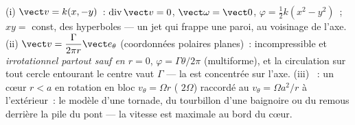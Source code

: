 \begin{example}\label{ex:b2:fluid-kinematics:planeflows}
(i) \emph{} $\vect v = k(x, -y)$~: $\operatorname{div}\vect v =
0$, $\vect\omega = \vect 0$, $\varphi = \tfrac12k(x^2 - y^2)$~; 
$xy = $ const, des hyperboles --- un jet qui frappe une paroi, au voisinage de l'axe. (ii)
\emph{} $\vect v = \dfrac{\Gamma}{2\pi r}\vect e_\theta$ (coordonnées
polaires planes)~: incompressible et \emph{irrotationnel partout
sauf en $r = 0$}, $\varphi = \Gamma\theta/2\pi$ (multiforme), et la
circulation sur tout cercle entourant le centre vaut $\Gamma$ --- la
 est concentrée sur l'axe. (iii) \emph{}~: un
cœur $r < a$ en rotation en bloc $v_\theta = \Omega r$ ( $2\Omega$)
raccordé au  $v_\theta = \Omega a^2/r$ à l'extérieur~: le modèle
d'une tornade, du tourbillon d'une baignoire ou du remous derrière la pile du pont --- la
vitesse est maximale au bord du cœur.
\end{example}

